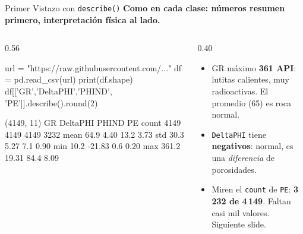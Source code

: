 \documentclass[aspectratio=169, 11pt]{beamer}
\begin{document}
\begin{frame}[fragile,shrink=28]{Primer Vistazo con \texttt{describe()}}
  \vspace{-4pt}
  {\small\color{arcaDark}\bfseries
    Como en cada clase: números resumen primero, interpretación física al lado.}

  \vspace{4pt}
  \begin{columns}[T]
    \begin{column}{0.56\textwidth}
      \begin{pyblock}
url = "https://raw.githubusercontent.com/..."
df = pd.read_csv(url)
print(df.shape)
df[['GR','DeltaPHI','PHIND',
    'PE']].describe().round(2)
      \end{pyblock}
      \vspace{2pt}
      \begin{outputblock}
(4149, 11)
         GR  DeltaPHI  PHIND      PE
count  4149      4149   4149    3232
mean   64.9      4.40   13.2    3.73
std    30.3      5.27    7.1    0.90
min    10.2    -21.83    0.6    0.20
max   361.2     19.31   84.4    8.09
      \end{outputblock}
    \end{column}
    \begin{column}{0.40\textwidth}
      {\scriptsize\color{textMuted}
      \begin{itemize}\setlength{\itemsep}{5pt}
        \item[{\color{arcaRed}\scriptsize\faArrowRight}]
          GR máximo \textbf{361 API}: lutitas calientes,
          muy radioactivas. El promedio (65) es roca normal.
        \item[{\color{arcaRed}\scriptsize\faArrowRight}]
          \texttt{DeltaPHI} tiene \textbf{negativos}: normal,
          es una \emph{diferencia} de porosidades.
        \item[{\color{arcaRed}\scriptsize\faExclamationTriangle}]
          Miren el \texttt{count} de \texttt{PE}:
          \textbf{3\,232 de 4\,149}. Faltan casi mil valores.
          Siguiente slide.
      \end{itemize}
      }
    \end{column}
  \end{columns}
\end{frame}
\end{document}
